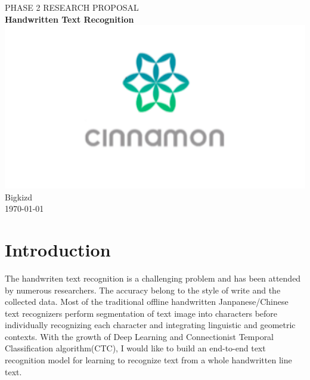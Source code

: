 \documentclass[14pt]{extarticle}
\newcommand{\<}{\langle}
\renewcommand{\>}{\rangle}
\theoremstyle{definition}
\begin{document}
\begin{titlepage}
\begin{center}
{\LARGE PHASE 2 RESEARCH PROPOSAL}\\[1.5cm]
\linespread{1.2}\huge {\bfseries Handwritten Text Recognition}\\[1.5cm]
\linespread{1}
\includegraphics[width=17cm]{cinnamon.png}\\[1cm]
{\Large Bigkizd}\\[1cm]

\today
\end{center}

\end{titlepage}

\section{Introduction}
The handwriten text recognition is a challenging problem and has been attended by numerous researchers. The accuracy belong to the style of write and the collected data. Most of the traditional offline handwritten Janpanese/Chinese text recognizers perform segmentation of text image into characters before individually recognizing each character and integrating linguistic and geometric contexts. With the growth of Deep Learning and Connectionist Temporal Classification algorithm(CTC), I would like to build an end-to-end text recognition model for learning to recognize text from a whole handwritten line text. 
\end{document}
